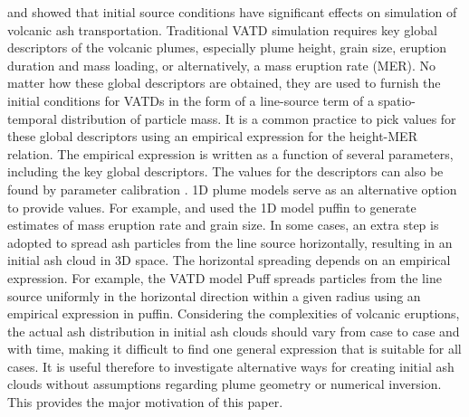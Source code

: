 \documentclass[draft,linenumbers]{agujournal2019}
\begin{document}
\citet{fero2009simulating} and \citet{stohl2011determination} showed that initial source conditions have significant effects on simulation of volcanic ash transportation. Traditional VATD simulation requires key global descriptors of the volcanic plumes, especially plume height, grain size, eruption duration and mass loading, or alternatively, a mass eruption rate (MER). No matter how these global descriptors are obtained, they are used to furnish the initial conditions for VATDs in the form of a line-source term of a spatio-temporal distribution of particle mass. It is a common practice to pick values for these global descriptors using an empirical expression for the height-MER relation. The empirical expression is written as a function of several parameters, including the key global descriptors. The values for the descriptors can also be found by parameter calibration \citep[e.g.][]{fero2008simulation,fero2009simulating, stohl2011determination, zidikheri2017estimation}. 1D plume models serve as an alternative option to provide values. For example, \citet{bursik2012estimation} and \citet{stefanescu2014temporal} used the 1D model puffin \citep{bursik2001effect} to generate estimates of mass eruption rate and grain size. In some cases, an extra step is adopted to spread ash particles from the line source horizontally, resulting in an initial ash cloud in 3D space. The horizontal spreading depends on an empirical expression. For example, the VATD model Puff spreads particles from the line source uniformly in the horizontal direction within a given radius using an empirical expression in puffin. Considering the complexities of volcanic eruptions, the actual ash distribution in initial ash clouds should vary from case to case and with time, making it difficult to find one general expression that is suitable for all cases. It is useful therefore to investigate alternative ways for creating initial ash clouds without assumptions regarding plume geometry or numerical inversion. This provides the major motivation of this paper.
\end{document}
